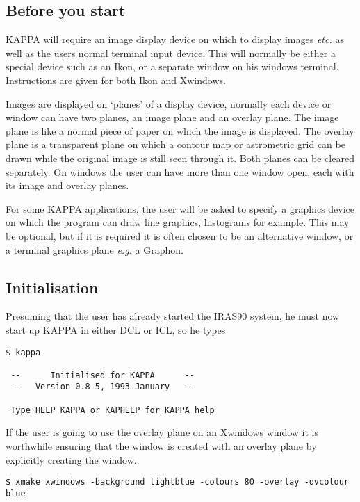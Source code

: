\documentclass[twoside,11pt]{article}
\begin{document}
\subsection{Before you start}
\label{k:before}
KAPPA will require an image display device on which to display images {\em
etc.} as
well as the users normal terminal input device. This will normally be either a 
special device such as an Ikon, or a separate window  on his windows 
terminal. Instructions are given for both Ikon and Xwindows.

Images are displayed on `planes' of a display device, normally each device
or window can have two planes, an image plane and an overlay plane. The image 
plane is like a normal piece of paper on which the image is displayed. The 
overlay plane is a transparent plane on which a contour map or astrometric grid
can be drawn while the original image is still seen through it. Both planes can
be cleared separately. On windows the user can have more than one window open,
each with its image and overlay planes.

For some KAPPA applications, the user will be asked to specify a graphics device
on which the program can draw line graphics, histograms for example. This may be
optional, but if it is required it is often chosen to be an alternative window,
or a terminal graphics plane {\em e.g.} a Graphon.
\subsection{Initialisation}
\label{k:init}
Presuming that the user has already started the IRAS90 system, he must now
start up KAPPA in either DCL or ICL, so he types

\begin{small}
\begin{verbatim}
$ kappa
 
 --      Initialised for KAPPA      -- 
 --   Version 0.8-5, 1993 January   -- 
 
 Type HELP KAPPA or KAPHELP for KAPPA help   
\end{verbatim}
\end{small}
If the user is going to use the overlay plane on an Xwindows window it is
worthwhile ensuring that the window is created with an overlay plane by
explicitly creating the window.
\begin{small}
\begin{verbatim}
$ xmake xwindows -background lightblue -colours 80 -overlay -ovcolour blue
\end{verbatim}
\end{small}
\end{document}
